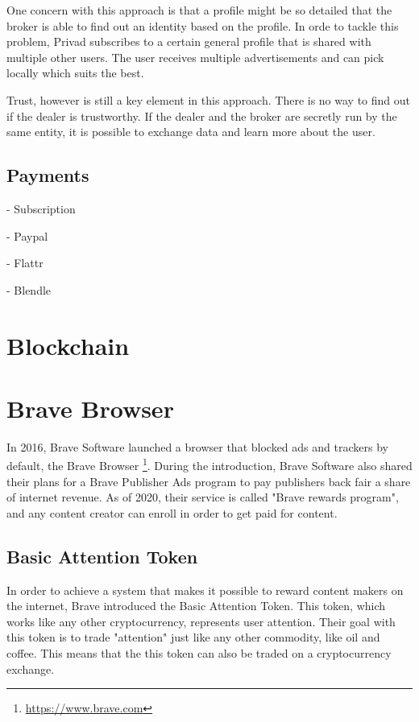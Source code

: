 One concern with this approach is that a profile might be so detailed that the broker is able to find out an identity based on the profile. In orde to tackle this problem, Privad subscribes to a certain general profile that is shared with multiple other users. The user receives multiple advertisements and can pick locally which suits the best.

Trust, however is still a key element in this approach. There is no way to find out if the dealer is trustworthy. If the dealer and the broker are secretly run by the same entity, it is possible to exchange data and learn more about the user. 

\subsection{Payments}

- Subscription

- Paypal

- Flattr

- Blendle






\section{Blockchain}

\section{Brave Browser}
In 2016, Brave Software launched a browser that blocked ads and trackers by default, the Brave Browser \footnote{\url{https://www.brave.com}}. During the introduction, Brave Software also shared their plans for a Brave Publisher Ads program to pay publishers back fair a share of internet revenue. As of 2020, their service is called "Brave rewards program", and any content creator can enroll in order to get paid for content. 

\subsection{Basic Attention Token} 
In order to achieve a system that makes it possible to reward content makers on the internet, Brave introduced the Basic Attention Token. This token, which works like any other cryptocurrency, represents user attention. Their goal with this token is to trade "attention" just like any other commodity, like oil and coffee. This means that the this token can also be traded on a cryptocurrency exchange. 

